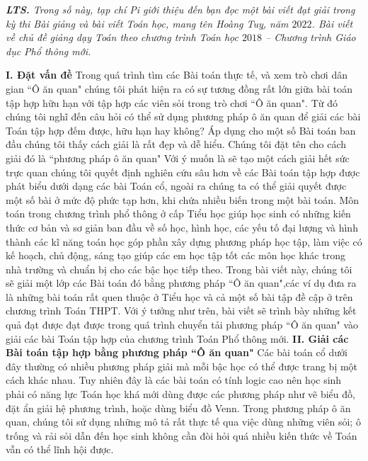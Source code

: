 \textit{\textbf{\color{diendantoanhoc}LTS.} Trong số này, tạp chí Pi giới thiệu đến bạn đọc một bài viết đạt giải trong kỳ thi Bài giảng và bài viết Toán học, mang tên Hoàng Tuỵ, năm $2022$. Bài viết về chủ đề giảng dạy Toán theo chương trình Toán học $2018$ -- Chương trình Giáo dục Phổ thông mới.}
\begin{multicols}{2}
	\textbf{\color{diendantoanhoc}I.	Đặt vấn đề}
	\vskip 0.1cm
	Trong quá trình tìm các Bài toán thực tế, và xem trò chơi dân gian ``Ô ăn quan" chúng tôi phát hiện ra có sự tương đồng rất lớn giữa bài toán tập hợp hữu hạn với tập hợp các viên sỏi trong trò chơi ``Ô ăn quan". Từ đó chúng tôi nghĩ đến câu hỏi có thể sử dụng phương pháp ô ăn quan để giải các bài Toán tập hợp đếm được, hữu hạn hay không? Áp dụng cho một số Bài toán ban đầu chúng tôi thấy cách giải là rất đẹp và dễ hiểu. Chúng tôi đặt tên cho cách giải đó là ``phương pháp ô ăn quan"
	\vskip 0.1cm
	Với ý muốn là sẽ tạo một cách giải hết sức trực quan chúng tôi quyết định nghiên cứu sâu hơn về các Bài toán tập hợp được phát biểu dưới dạng các bài Toán cổ, ngoài ra chúng ta có thể giải quyết được một số bài ở mức độ phức tạp hơn, khi chứa nhiều biến trong một bài toán.
	\vskip 0.1cm
	Môn toán trong chương trình phổ thông ở cấp Tiểu học giúp học sinh có những kiến thức cơ bản và sơ giản ban đầu về số học, hình học, các yếu tố đại lượng và hình thành các kĩ năng toán học góp phần xây dựng phương pháp học tập, làm việc có kế hoạch, chủ động, sáng tạo giúp các em học tập tốt các môn học khác trong nhà trường và chuẩn bị cho các bậc học tiếp theo. Trong bài viết này, chúng tôi sẽ giải một lớp các Bài toán đó bằng phương pháp ``Ô ăn quan",các ví dụ đưa ra là những bài toán rất quen thuộc ở Tiểu học và cả một số bài tập đề cập ở trên chương trình Toán THPT.
	\vskip 0.1cm
	Với ý tưởng như trên, bài viết sẽ trình bày những kết quả đạt được đạt được trong quá trình chuyển tải phương pháp ``Ô ăn quan" vào giải các bài Toán tập hợp của chương trình Toán Phổ thông mới.
	\vskip 0.1cm
	\textbf{\color{diendantoanhoc}II.	Giải các Bài toán tập hợp bằng phương pháp ``Ô ăn quan"}
	\vskip 0.1cm
	Các bài toán cổ dưới đây thường có nhiều phương pháp giải mà mỗi bậc học có thể được trang bị một cách khác nhau. Tuy nhiên đây là các bài toán có tính logic cao nên học sinh phải có năng lực Toán học khá mới dùng được các phương pháp như vẽ biểu đồ, đặt ẩn giải hệ phương trình, hoặc dùng biểu đồ Venn. Trong phương pháp ô ăn quan, chúng tôi sử dụng những mô tả rất thực tế qua việc dùng những viên sỏi; ô trống và rải sỏi dẫn đến học sinh không cần đòi hỏi quá nhiều kiến thức về Toán vẫn có thể lĩnh hội được.

\end{multicols}
